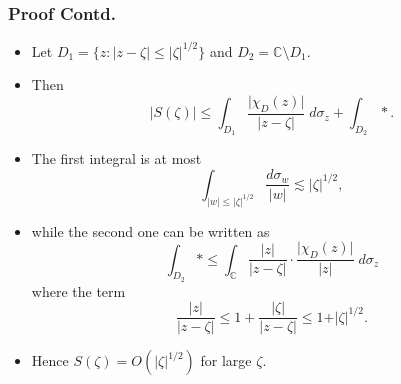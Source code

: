 \documentclass{beamer}
\begin{document}

\begin{frame}
 \frametitle{Proof Contd.}

 \begin{itemize}

 \item Let $D_1 = \{z : \vert z - \zeta \vert \le \vert \zeta \vert^{1/2}\}$ and $D_2 = \mathbb C \setminus D_1$.

\medskip

 \item Then
\[
\vert S(\zeta) \vert \le \int_{D_1} \frac{\vert \chi_D(z) \vert}{\vert z - \zeta \vert} \; d\sigma_z + \int_{D_2} \ast.
\]
 
\medskip

 \item The first integral is at most 
\[
\int_{\vert w \vert \le \vert \zeta \vert^{1/2}} \frac{d \sigma_w}{\vert w \vert} \lesssim \vert \zeta \vert^{1/2},
\]

\end{itemize}

\end{frame}

\begin{frame}

 \begin{itemize}

 \item while the second one can be written as
\[
\int_{D_2} \ast \le \int_{\mathbb C}  \frac{\vert z \vert}{\vert z -\zeta \vert} \cdot \frac{\vert \chi_D(z) \vert}{\vert z\vert} \; d \sigma_z
\]
where the term
\[
\frac{\vert z \vert}{\vert z -\zeta \vert} \le 1 + \frac{\vert \zeta \vert}{\vert z -\zeta \vert} \le 1 +  \vert \zeta \vert^{1/2}. 
\]
 
 \item Hence $S(\zeta) = O(\vert \zeta \vert^{1/2})$ for large $\zeta$.


 \end{itemize}

\end{frame}

\end{document}

